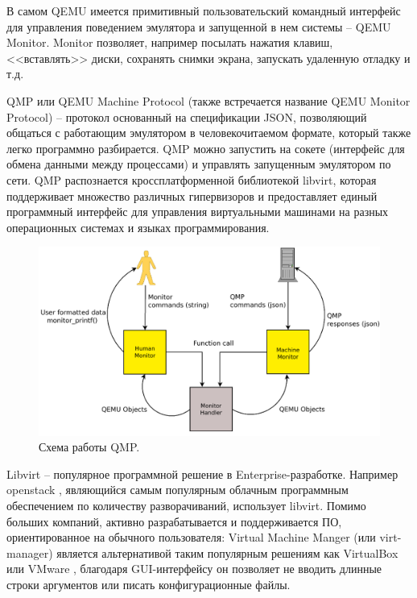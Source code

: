В самом QEMU имеется примитивный пользовательский командный интерфейс для управления поведением эмулятора
и запущенной в нем системы -- QEMU Monitor. Monitor позволяет, например
посылать нажатия клавиш, <<вставлять>> диски, сохранять снимки экрана, запускать удаленную отладку и т.д.

QMP \cite{qmp} или QEMU Machine Protocol (также встречается название QEMU Monitor Protocol) -- протокол
основанный на спецификации JSON, позволяющий общаться с работающим эмулятором в человекочитаемом
формате, который также легко программно разбирается.
QMP можно запустить на сокете (интерфейс для обмена данными между процессами) и управлять запущенным эмулятором по сети.
QMP распознается кроссплатформенной библиотекой libvirt, которая поддерживает множество
различных гипервизоров и предоставляет единый программный интерфейс для управления виртуальными машинами на
разных операционных системах и языках программирования.

\begin{figure}[!htbp]
    \centering
    \begin{adjustbox}{max totalsize={0.8\textwidth}{\textheight}}
        \includegraphics[]{images/qmp.png}
    \end{adjustbox}
    \caption{Схема работы QMP.}\label{fig:qmp}
\end{figure}

Libvirt -- популярное программной решение в Enterprise-разработке. Например openstack \cite{openstack}, являющийся
самым популярным облачным программным обеспечением по количеству разворачиваний, использует libvirt.
Помимо больших компаний, активно разрабатывается и поддерживается ПО, ориентированное на обычного пользователя:
Virtual Machine Manger (или virt-manager) является альтернативой таким популярным решениям как VirtualBox \cite{virtualbox} или
VMware \cite{vmware}, благодаря GUI-интерфейсу он позволяет не вводить длинные строки аргументов или писать
конфигурационные файлы.

